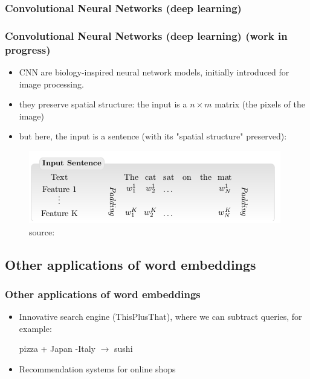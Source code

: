 \documentclass{beamer}
\begin{document}
\begin{frame}



\subsubsection{Convolutional Neural Networks (deep learning)}

\frametitle{Convolutional Neural Networks (deep learning) (work in progress)}

\begin{itemize}
\item CNN are biology-inspired neural network models, initially introduced for image processing.
\item they preserve spatial structure: the input is a $n \times m$ matrix (the pixels of the image)
\item but here, the input is a sentence (with its "spatial structure" preserved): 
\end{itemize}

\begin{figure}
\includegraphics[width=1.0\linewidth]{collobert.png}
\caption{source: \cite{collobert11}}
\end{figure}


\end{frame}

\begin{frame}

\subsection{Other applications of word embeddings}

\frametitle{Other applications of word embeddings}

\begin{itemize}
\item Innovative search engine (ThisPlusThat), where we can subtract queries, for example:

\begin{center}
pizza + Japan -Italy $\rightarrow$ sushi
\end{center}  
 
\item Recommendation systems for online shops
\end{itemize}


\end{frame}
\end{document}
